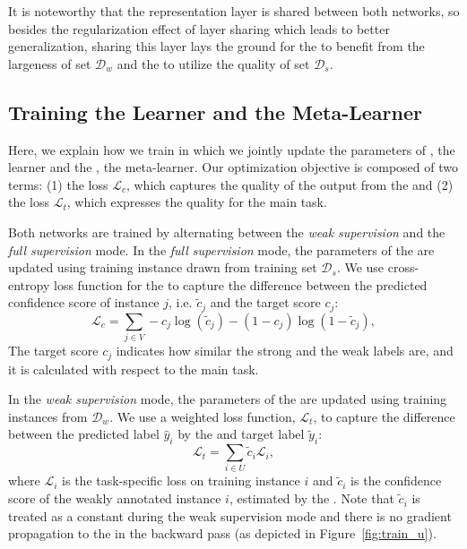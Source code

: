 It is noteworthy that the representation layer is shared between both networks, so besides the regularization effect of layer sharing which leads to better generalization, sharing this layer lays the ground for the \cnet to benefit from the largeness of set $\mathcal{D}_w$ and the \tnet to utilize the quality of set $\mathcal{D}_s$. 

\subsection{Training the Learner and the Meta-Learner}
\label{sec:modeltraining}
Here, we explain how we train \cws in which we jointly update the parameters of \tnet, the learner and the \cnet, the meta-learner. 
Our optimization objective is composed of two terms: (1) the \cnet loss $\mathcal{L}_c$, which captures the quality of the output from the \cnet and (2) the \tnet loss $\mathcal{L}_t$, which expresses the quality for the main task. 

Both networks are trained by alternating between the \emph{weak supervision} and the \emph{full supervision} mode.
%
In the \emph{full supervision} mode, the parameters of the \cnet are updated using training instance drawn from training set $\mathcal{D}_s$. We use cross-entropy loss function for the \cnet to capture the difference between the predicted confidence score of instance $j$, i.e. $\tilde{c}_j$ and the target score $c_j$:
\begin{equation}
\mathcal{L}_c = \sum_{j\in V} -  c_j \log(\tilde{c}_j) - (1-c_j) \log(1-\tilde{c}_j),
\end{equation}
The target score $c_j$ indicates how similar the strong and the weak labels are, and it is calculated with respect to the main task. 

In the \emph{weak supervision} mode, the parameters of the \tnet are updated using training instances from $\mathcal{D}_w$. We use a weighted loss function, $\mathcal{L}_t$, to capture the difference between the predicted label $\hat{y}_i$ by the \tnet and target label $\tilde{y}_i$:
\begin{equation}
\mathcal{L}_t = \sum_{i\in U} \tilde{c}_i \mathcal{L}_i,
\end{equation}
where $\mathcal{L}_i$ is the task-specific loss on training instance $i$ and $\tilde{c}_i$ is the confidence score of the weakly annotated instance $i$, estimated by the \cnet.
Note that $\tilde{c}_i$ is treated as a constant during the weak supervision mode and there is no gradient propagation to the \cnet in the backward pass (as depicted in Figure~\ref{fig:train_u}). 

